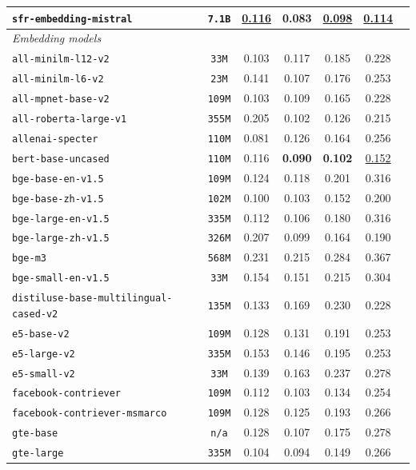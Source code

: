 \documentclass{article}
\begin{document}
\begin{table}[htbp]
{\begin{tabular}{lcccccc}
\texttt{sfr-embedding-mistral} & \texttt{7.1B} & \underline{0.116} & \textbf{0.083} & \underline{0.098} & \underline{0.114} \\
\midrule
\multicolumn{6}{l}{\textit{Embedding models}} \\
\midrule
\texttt{all-minilm-l12-v2} & \texttt{33M} & 0.103 & 0.117 & 0.185 & 0.228 \\
\texttt{all-minilm-l6-v2} & \texttt{23M} & 0.141 & 0.107 & 0.176 & 0.253 \\
\texttt{all-mpnet-base-v2} & \texttt{109M} & 0.103 & 0.109 & 0.165 & 0.228 \\
\texttt{all-roberta-large-v1} & \texttt{355M} & 0.205 & 0.102 & 0.126 & 0.215 \\
\texttt{allenai-specter} & \texttt{110M} & 0.081 & 0.126 & 0.164 & 0.256 \\
\texttt{bert-base-uncased} & \texttt{110M} & 0.116 & \textbf{0.090} & \textbf{0.102} & \underline{0.152} \\
\texttt{bge-base-en-v1.5} & \texttt{109M} & 0.124 & 0.118 & 0.201 & 0.316 \\
\texttt{bge-base-zh-v1.5} & \texttt{102M} & 0.100 & 0.103 & 0.152 & 0.200 \\
\texttt{bge-large-en-v1.5} & \texttt{335M} & 0.112 & 0.106 & 0.180 & 0.316 \\
\texttt{bge-large-zh-v1.5} & \texttt{326M} & 0.207 & 0.099 & 0.164 & 0.190 \\
\texttt{bge-m3} & \texttt{568M} & 0.231 & 0.215 & 0.284 & 0.367 \\
\texttt{bge-small-en-v1.5} & \texttt{33M} & 0.154 & 0.151 & 0.215 & 0.304 \\
\texttt{distiluse-base-multilingual-cased-v2} & \texttt{135M} & 0.133 & 0.169 & 0.230 & 0.228 \\
\texttt{e5-base-v2} & \texttt{109M} & 0.128 & 0.131 & 0.191 & 0.253 \\
\texttt{e5-large-v2} & \texttt{335M} & 0.153 & 0.146 & 0.195 & 0.253 \\
\texttt{e5-small-v2} & \texttt{33M} & 0.139 & 0.163 & 0.237 & 0.278 \\
\texttt{facebook-contriever} & \texttt{109M} & 0.112 & 0.103 & 0.134 & 0.254 \\
\texttt{facebook-contriever-msmarco} & \texttt{109M} & 0.128 & 0.125 & 0.193 & 0.266 \\
\texttt{gte-base} & \texttt{n/a} & 0.128 & 0.107 & 0.175 & 0.278 \\
\texttt{gte-large} & \texttt{335M} & 0.104 & 0.094 & 0.149 & 0.266 \\

\end{tabular}}
\end{table}
\end{document}
